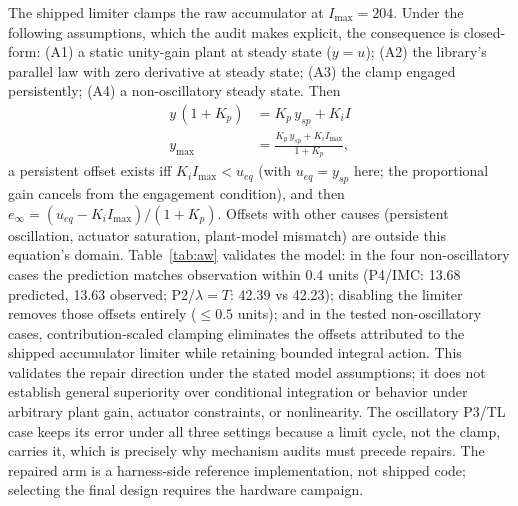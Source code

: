 \documentclass[10pt,twocolumn]{article}
\begin{document}
The shipped limiter clamps the raw accumulator at $I_{\max} = 204$. Under the following assumptions, which the audit makes explicit, the consequence is closed-form: (A1) a static unity-gain plant at steady state ($y = u$); (A2) the library's parallel law with zero derivative at steady state; (A3) the clamp engaged persistently; (A4) a non-oscillatory steady state. Then
\begin{equation}
\begin{split}
y\,(1 + K_p) &= K_p\, y_{sp} + K_i I \\
y_{\max} &= \frac{K_p\, y_{sp} + K_i I_{\max}}{1 + K_p},
\end{split}
\label{eq:aw}
\end{equation}
a persistent offset exists iff $K_i I_{\max} < u_{eq}$ (with $u_{eq} = y_{sp}$ here; the proportional gain cancels from the engagement condition), and then $e_\infty = (u_{eq} - K_i I_{\max})/(1 + K_p)$. Offsets with other causes (persistent oscillation, actuator saturation, plant-model mismatch) are outside this equation's domain. Table~\ref{tab:aw} validates the model: in the four non-oscillatory cases the prediction matches observation within 0.4 units (P4/IMC: 13.68 predicted, 13.63 observed; P2/$\lambda{=}T$: 42.39 vs 42.23); disabling the limiter removes those offsets entirely ($\le 0.5$ units); and in the tested non-oscillatory cases, contribution-scaled clamping eliminates the offsets attributed to the shipped accumulator limiter while retaining bounded integral action. This validates the repair direction under the stated model assumptions; it does not establish general superiority over conditional integration or behavior under arbitrary plant gain, actuator constraints, or nonlinearity. The oscillatory P3/TL case keeps its error under all three settings because a limit cycle, not the clamp, carries it, which is precisely why mechanism audits must precede repairs. The repaired arm is a harness-side reference implementation, not shipped code; selecting the final design \cite{astrom2006, visioli2006} requires the hardware campaign.

\begin{table}[t]
\centering
\caption{Anti-windup audit. $I_{eq} = u_{eq}/K_i$ versus the clamp $I_{\max}=204$; predicted offset (Eq.~\eqref{eq:aw}) versus observed with the limiter on, with it off, and with the harness-side reference repair (contribution clamp, identical law otherwise).}
\label{tab:aw}
\scriptsize
\setlength{\tabcolsep}{2pt}

\end{table}
\end{document}
